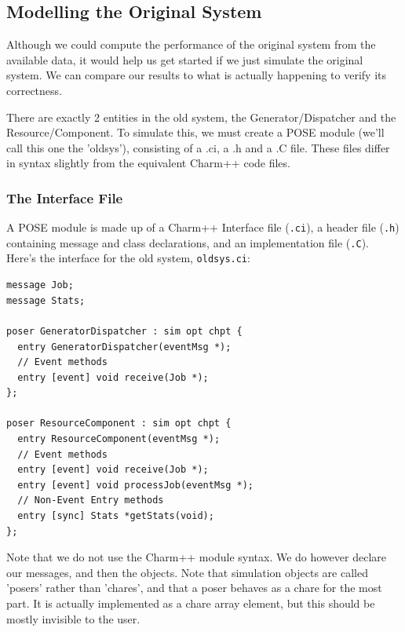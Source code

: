 \documentclass[10pt]{article}
\begin{document}
\subsection{Modelling the Original System}

Although we could compute the performance of the original system from
the available data, it would help us get started if we just simulate
the original system.  We can compare our results to what is actually
happening to verify its correctness.

There are exactly 2 entities in the old system, the Generator/Dispatcher and
the Resource/Component.  To simulate this, we must create a POSE module (we'll
call this one the 'oldsys'), consisting of a .ci, a .h and a .C file.  These
files differ in syntax slightly from the equivalent Charm++ code files.

\subsubsection{The Interface File}

A POSE module is made up of a Charm++ Interface file ({\tt .ci}), a
header file ({\tt .h}) containing message and class declarations, and
an implementation file ({\tt .C}).  Here's the interface for the old
system, {\tt oldsys.ci}:

\begin{verbatim}
message Job;
message Stats;

poser GeneratorDispatcher : sim opt chpt {
  entry GeneratorDispatcher(eventMsg *);
  // Event methods
  entry [event] void receive(Job *);
};

poser ResourceComponent : sim opt chpt {
  entry ResourceComponent(eventMsg *);
  // Event methods
  entry [event] void receive(Job *);
  entry [event] void processJob(eventMsg *);
  // Non-Event Entry methods
  entry [sync] Stats *getStats(void);
};
\end{verbatim}

Note that we do not use the Charm++ module syntax.  We do however declare our
messages, and then the objects.  Note that simulation objects are called
'posers' rather than 'chares', and that a poser behaves as a chare for the
most part.  It is actually implemented as a chare array element, but this
should be mostly invisible to the user.  
\end{document}

